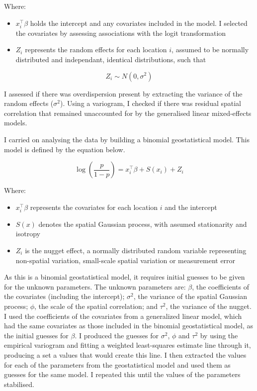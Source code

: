 \documentclass[
]{article}
\providecommand{\tightlist}{%
  \setlength{\itemsep}{0pt}\setlength{\parskip}{0pt}}
\begin{document}
Where:

\begin{itemize}
\tightlist
\item
  \(x_i^\intercal\beta\) holds the intercept and any covariates included
  in the model. I selected the covariates by assessing associations with
  the logit transformation
\item
  \(Z_i\) represents the random effects for each location \(i\), assumed
  to be normally distributed and independant, identical distributions,
  such that
\end{itemize}

\[ Z_i \sim N(0, \sigma^2)  \]

I assessed if there was overdispersion present by extracting the
variance of the random effects (\(\sigma^2\)). Using a variogram, I
checked if there was residual spatial correlation that remained
unaccounted for by the generalised linear mixed-effects models.

I carried on analysing the data by building a binomial geostatistical
model. This model is defined by the equation below.

\[ \log\left(\frac{p}{1-p}\right) = x_i^\intercal\beta + S(x_i) + Z_i \]

Where:

\begin{itemize}
\tightlist
\item
  \(x_i^\intercal\beta\) represents the covariates for each location
  \(i\) and the intercept
\item
  \(S(x)\) denotes the spatial Gaussian process, with assumed
  stationarity and isotropy
\item
  \(Z_i\) is the nugget effect, a normally distributed random variable
  representing non-spatial variation, small-scale spatial variation or
  measurement error
\end{itemize}

As this is a binomial geostatistical model, it requires initial guesses
to be given for the unknown parameters. The unknown parameters are:
\(\beta\), the coefficients of the covariates (including the intercept);
\(\sigma^2\), the variance of the spatial Gaussian process; \(\phi\),
the scale of the spatial correlation; and \(\tau^2\), the variance of
the nugget. I used the coefficients of the covariates from a generalized
linear model, which had the same covariates as those included in the
binomial geostatistical model, as the initial guesses for \(\beta\). I
produced the guesses for \(\sigma^2\), \(\phi\) and \(\tau^2\) by using
the empirical variogram and fitting a weighted least-squares estimate
line through it, producing a set a values that would create this line. I
then extracted the values for each of the parameters from the
geostatistical model and used them as guesses for the same model. I
repeated this until the values of the parameters stabilised.
\end{document}
